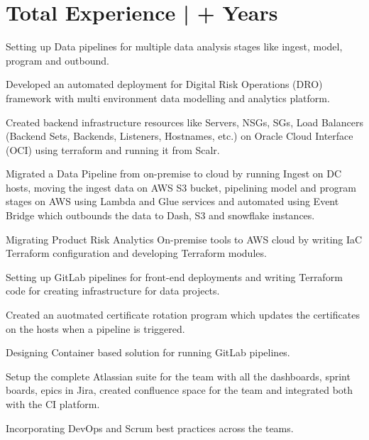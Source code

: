 \documentclass[a4paper]{deedy-resume-openfont}
\begin{document}
\section{Total Experience |  \bf\fontsize{10}{15}+ Years}
\begin{tightemize}
\item Setting up Data pipelines for multiple data analysis stages like ingest, model, program and outbound.
\item Developed an automated deployment for Digital Risk Operations (DRO) framework with multi environment data modelling and analytics platform.
\item Created backend infrastructure resources like Servers, NSGs, SGs, Load Balancers (Backend Sets, Backends, Listeners, Hostnames, etc.) on Oracle Cloud Interface (OCI) using terraform and running it from Scalr.
\item Migrated a Data Pipeline from on-premise to cloud by running Ingest on DC hosts, moving the ingest data on AWS S3 bucket, pipelining model and program stages on AWS using Lambda and Glue services and automated using Event Bridge which outbounds the data to Dash, S3 and snowflake instances.
\item Migrating Product Risk Analytics On-premise tools to AWS cloud by writing IaC Terraform configuration and developing Terraform modules.
\item Setting up GitLab pipelines for front-end deployments and writing Terraform code for creating infrastructure for data projects.
\item Created an auotmated certificate rotation program which updates the certificates on the hosts when a pipeline is triggered.
\item Designing Container based solution for running GitLab pipelines.
\item Setup the complete Atlassian suite for the team with all the dashboards, sprint boards, epics in Jira, created confluence space for the team and integrated both with the CI platform.
\item Incorporating DevOps and Scrum best practices across the teams.
\end{tightemize}
\sectionsep
\end{document}
